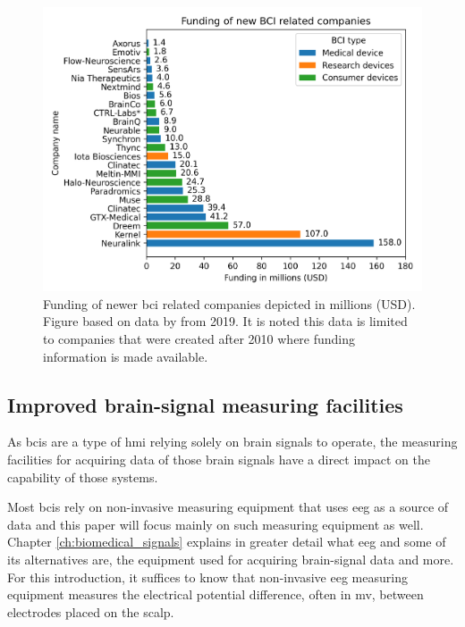 \begin{figure}[ht]
    \centering
    \includegraphics[width=\linewidth]{../images/introduction/funding.pdf}
    \captionsetup{width=0.9\linewidth}
    \captionsetup{justification=centering}
    \caption{Funding of newer \gls{bci} related companies depicted in millions (USD).\\Figure based on data by \citet{bci_money} from 2019. It is noted this data is limited to companies that were created after 2010 where funding information is made available.}
    \label{fig:bci_money}
\end{figure}



\subsection{Improved brain-signal measuring facilities}
\label{subsec:bci_gaining_popularity_better_measuring}


As \glspl{bci} are a type of \gls{hmi} relying solely on brain signals to operate, the measuring facilities for acquiring data of those brain signals have a direct impact on the capability of those systems.

Most \glspl{bci} rely on non-invasive measuring equipment that uses \gls{eeg} as a source of data and this paper will focus mainly on such measuring equipment as well.
Chapter \ref{ch:biomedical_signals} explains in greater detail what \gls{eeg} and some of its alternatives are, the equipment used for acquiring brain-signal data and more.
For this introduction, it suffices to know that non-invasive \gls{eeg} measuring equipment measures the electrical potential difference, often in \gls{mv}, between electrodes placed on the scalp.

